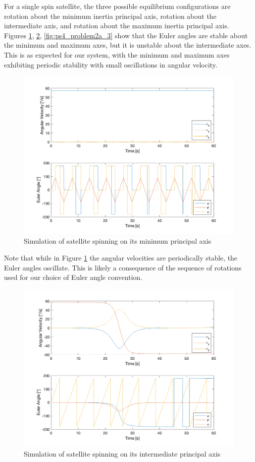 For a single spin satellite, the three possible equilibrium configurations are rotation about the minimum inertia principal axis, rotation about the intermediate axis, and rotation about the maximum inertia principal axis. Figures \ref{fig:ps4_problem2a_1}, \ref{fig:ps4_problem2a_2}, \ref{fig:ps4_problem2a_3} show that the Euler angles are stable about the minimum and maximum axes, but it is unstable about the intermediate axes. This is as expected for our system, with the minimum and maximum axes exhibiting periodic stability with small oscillations in angular velocity.

\begin{figure}[H]
\centering
\includegraphics[scale=0.6]{Images/ps4_problem2a_1.png}
\caption{Simulation of satellite spinning on its minimum principal axis}
\label{fig:ps4_problem2a_1}
\end{figure}

Note that while in Figure \ref{fig:ps4_problem2a_1} the angular velocities are periodically stable, the Euler angles oscillate. This is likely a consequence of the sequence of rotations used for our choice of Euler angle convention.

\begin{figure}[H]
\centering
\includegraphics[scale=0.6]{Images/ps4_problem2a_2.png}
\caption{Simulation of satellite spinning on its intermediate principal axis}
\label{fig:ps4_problem2a_2}
\end{figure}

